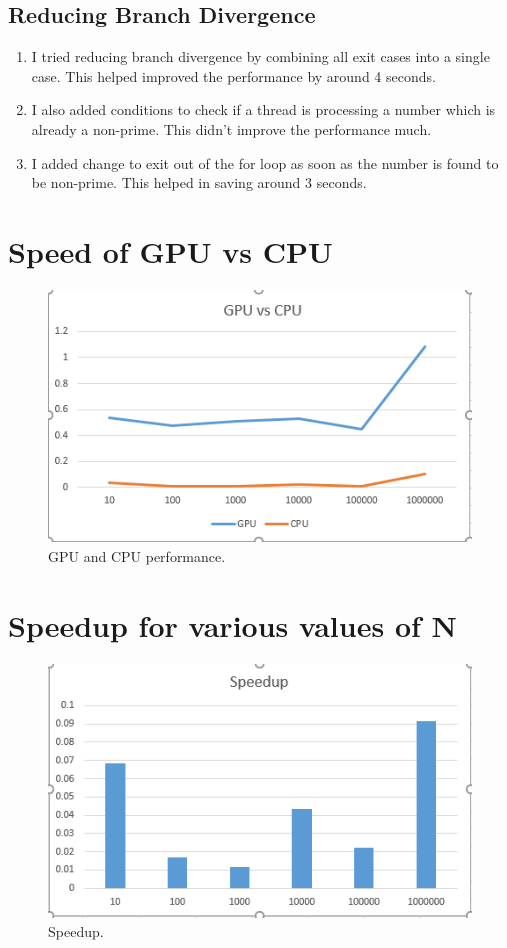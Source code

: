 \documentclass{article}
\begin{document}
\subsection{Reducing Branch Divergence}
\begin{enumerate}
    \item I tried reducing branch divergence by combining all exit cases into a single case.  This helped improved the performance by around 4 seconds.
    \item I also added conditions to check if a thread is processing a number which is already a non-prime.  This didn't improve the performance much.
    \item I added change to exit out of the for loop as soon as the number is found to be non-prime.  This helped in saving around 3 seconds.
\end{enumerate}

\section{Speed of GPU vs CPU}
\begin{figure}[ht!]
  \centering
  \includegraphics[width=1\textwidth]{gpuvscpu}
  \caption{GPU and CPU performance.\label{fig:gpuvscpu}}
\end{figure}

\section{Speedup for various values of N}
\begin{figure}[ht!]
  \centering
  \includegraphics[width=1\textwidth]{speedup}
  \caption{Speedup.\label{fig:speedup}}
\end{figure}
\end{document}
